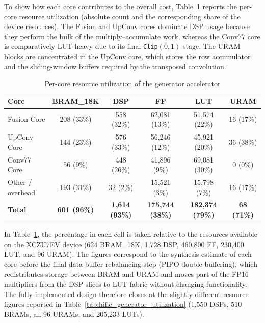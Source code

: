 To show how each core contributes to the overall cost, Table~\ref{tab:resource_breakdown} reports the per-core resource utilization (absolute count and the corresponding share of the device resources). The Fusion and UpConv cores dominate DSP usage because they perform the bulk of the multiply--accumulate work, whereas the Conv77 core is comparatively LUT-heavy due to its final \texttt{Clip}$(0,1)$ stage. The URAM blocks are concentrated in the UpConv core, which stores the row accumulator and the sliding-window buffers required by the transposed convolution.

\begin{table}[H]
    \centering
    \caption{Per-core resource utilization of the generator accelerator}
    \label{tab:resource_breakdown}
    \small
    \setlength{\tabcolsep}{4pt}
    \renewcommand{\arraystretch}{1.2}
    \begin{tabular}{|l|c|c|c|c|c|}
        \hline
        \textbf{Core} & \textbf{BRAM\_18K} & \textbf{DSP} & \textbf{FF} & \textbf{LUT} & \textbf{URAM} \\
        \hline
        Fusion Core & 208 (33\%) & 558 (32\%) & 62,081 (13\%) & 51,574 (22\%) & 16 (17\%) \\
        \hline
        UpConv Core & 144 (23\%) & 576 (33\%) & 56,246 (12\%) & 45,921 (20\%) & 36 (38\%) \\
        \hline
        Conv77 Core & 56 (9\%) & 448 (26\%) & 41,896 (9\%) & 69,081 (30\%) & 0 (0\%) \\
        \hline
        Other / overhead & 193 (31\%) & 32 (2\%) & 15,521 (3\%) & 15,798 (7\%) & 16 (17\%) \\
        \hline
        \textbf{Total} & \textbf{601 (96\%)} & \textbf{1,614 (93\%)} & \textbf{175,744 (38\%)} & \textbf{182,374 (79\%)} & \textbf{68 (71\%)} \\
        \hline
    \end{tabular}
\end{table}

In Table~\ref{tab:resource_breakdown}, the percentage in each cell is taken relative to the resources available on the XCZU7EV device (624 BRAM\_18K, 1{,}728 DSP, 460{,}800 FF, 230{,}400 LUT, and 96 URAM). The figures correspond to the synthesis estimate of each core before the final data-buffer rebalancing step (PIPO double-buffering), which redistributes storage between BRAM and URAM and moves part of the FP16 multipliers from the DSP slices to LUT fabric without changing functionality. The fully implemented design therefore closes at the slightly different resource figures reported in Table~\ref{tab:hific_generator_utilization} (1,550 DSPs, 510 BRAMs, all 96 URAMs, and 205,233 LUTs).


